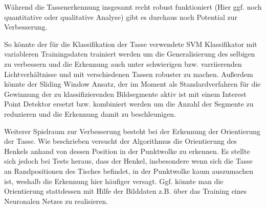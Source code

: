 Während die Tassenerkennung insgesamt recht robust funktioniert (Hier ggf. noch quantitative oder qualitative Analyse) gibt es durchaus noch Potential zur Verbesserung.

So könnte der für die Klassifikation der Tasse verwendete SVM Klassifikator mit variableren Trainingsdaten trainiert werden um die Generalisierung des selbigen zu verbessern und die Erkennung auch unter schwierigen bzw. varriierenden Lichtverhältnisse und mit verschiedenen Tassen robuster zu machen. Außerdem könnte der Sliding Window Ansatz, der im Moment als Standardverfahren für die Gewinnung der zu klassifizierenden Bildsegmente aktiv ist mit einem Interest Point Detektor ersetzt bzw. kombiniert werden um die Anzahl der Segmente zu reduzieren und die Erkennung damit zu beschleunigen.

Weiterer Spielraum zur Verbesserung besteht bei der Erkennung der Orientierung der Tasse. Wie beschrieben versucht der Algorithmus die Orientierung des Henkels anhand von dessen Position in der Punktwolke zu erkennen. Es stellte sich jedoch bei Tests heraus, dass der Henkel, insbesondere wenn sich die Tasse an Randpositionen des Tisches befindet, in der Punktwolke kaum auszumachen ist, weshalb die Erkennung hier häufiger versagt. Ggf. könnte man die Orientierung stattdessen mit Hilfe der Bilddaten z.B. über das Training eines Neuronalen Netzes zu realisieren.